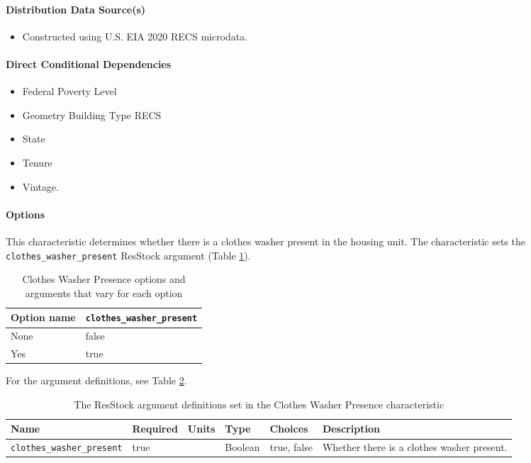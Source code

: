\paragraph{Distribution Data Source(s)}
\begin{itemize}
\item 
Constructed using U.S. EIA 2020 RECS microdata. 
\end{itemize}

\paragraph{Direct Conditional Dependencies}
\begin{itemize}
    \item Federal Poverty Level
    \item Geometry Building Type RECS
    \item State
    \item Tenure
    \item Vintage.
\end{itemize}

\paragraph{Options}
This characteristic determines whether there is a clothes washer present in the housing unit. The characteristic sets the \texttt{clothes\_washer\_present} ResStock argument (Table \ref{table:opt_def_clothes_washer}).

\begin{longtable}[]{ |p{2.5cm}|p{3cm}| }
\caption{Clothes Washer Presence options and arguments that vary for each option} \label{table:opt_def_clothes_washer} \\
\toprule\noalign{}
Option name & \texttt{clothes\_washer\_present} \\
\midrule\noalign{}
\endhead
\bottomrule\noalign{}
\endlastfoot
None & false \\
Yes & true \\
\end{longtable}

For the argument definitions, see Table \ref{table:hc_arg_def_clothes_washer_presence}.

\begin{longtable}[]{ |p{}|p{1.5cm}|p{1cm}|p{1.1cm}|p{3.4cm}|p{4cm}| }
\caption{The ResStock argument definitions set in the Clothes Washer Presence characteristic}\label{table:hc_arg_def_clothes_washer_presence}\\
\toprule\noalign{}
Name & Required & Units & Type & Choices & Description \\
\midrule\noalign{}
\endhead
\bottomrule\noalign{}
\endlastfoot
\texttt{clothes\_washer\_present} & true & & Boolean & true, false &
Whether there is a clothes washer present. \\
\end{longtable}

